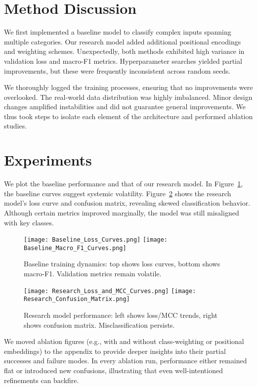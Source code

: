 \documentclass[11pt]{article}
\begin{document}
\section{Method Discussion}
We first implemented a baseline model to classify complex inputs spanning multiple categories. Our research model added additional positional encodings and weighting schemes. Unexpectedly, both methods exhibited high variance in validation loss and macro-F1 metrics. Hyperparameter searches yielded partial improvements, but these were frequently inconsistent across random seeds.

We thoroughly logged the training processes, ensuring that no improvements were overlooked. The real-world data distribution was highly imbalanced. Minor design changes amplified instabilities and did not guarantee general improvements. We thus took steps to isolate each element of the architecture and performed ablation studies.

\section{Experiments}
We plot the baseline performance and that of our research model. In Figure~\ref{fig:baseline}, the baseline curves suggest systemic volatility. Figure~\ref{fig:research} shows the research model's loss curve and confusion matrix, revealing skewed classification behavior. Although certain metrics improved marginally, the model was still misaligned with key classes.

\begin{figure}[t]
    \centering
    \texttt{[image: Baseline\_Loss\_Curves.png]}
    \texttt{[image: Baseline\_Macro\_F1\_Curves.png]}
    \caption{Baseline training dynamics: top shows loss curves, bottom shows macro-F1. Validation metrics remain volatile.}
    \label{fig:baseline}
\end{figure}

\begin{figure}[t]
    \centering
    \texttt{[image: Research\_Loss\_and\_MCC\_Curves.png]}
    \texttt{[image: Research\_Confusion\_Matrix.png]}
    \caption{Research model performance: left shows loss/MCC trends, right shows confusion matrix. Misclassification persists.}
    \label{fig:research}
\end{figure}

We moved ablation figures (e.g., with and without class-weighting or positional embeddings) to the appendix to provide deeper insights into their partial successes and failure modes. In every ablation run, performance either remained flat or introduced new confusions, illustrating that even well-intentioned refinements can backfire.
\end{document}
